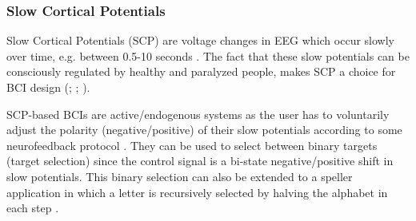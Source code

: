 \documentclass[12pt]{article}
\newcommand\mysubsubsection[1]{\subsubsection{#1}}
\numberwithin{equation}{section}
\numberwithin{figure}{section}
\numberwithin{table}{section}
\begin{document}
\mysubsubsection{Slow Cortical Potentials}
\par{
    Slow Cortical Potentials (SCP) are voltage changes in EEG which occur
    slowly over time, e.g. between 0.5-10 seconds \citep{wolpaw_brain_2010}.
    The fact that these slow potentials can be consciously regulated
    by healthy and paralyzed people, makes SCP a choice for BCI design
    (\citealp{birbaumer_thought_2000}; \citealp{hinterberger_brain-computer_2004}; \citealp{birbaumer_breaking_2006}).
}
\par{
    SCP-based BCIs are active/endogenous systems as the user has to voluntarily adjust
    the polarity (negative/positive) of their slow potentials according to some neurofeedback protocol \citep{jackson_neural_2010}.
    They can be used to select between binary targets (target selection) since the control signal is a bi-state
    negative/positive shift in slow potentials. This binary selection can also be extended
    to a speller application in which a letter is recursively selected by halving
    the alphabet in each step \citep{birbaumer_thought_2000}.
}
\end{document}
